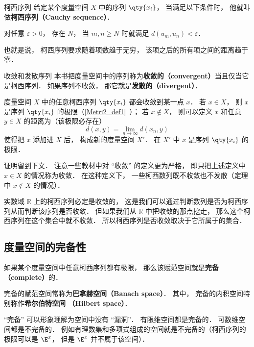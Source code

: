 

\begin{definition}{柯西序列}
给定某个度量空间 $X$ 中的序列 $\qty{x_i}$， 当满足以下条件时， 他就叫做\textbf{柯西序列（Cauchy sequence）}．

对任意 $\varepsilon > 0$， 存在 $N$， 当 $m, n \geqslant N$ 时就满足 $d(u_m, u_n) < \varepsilon$．
\end{definition}
也就是说， 柯西序列要求随着项数趋于无穷， 该项之后的所有项之间的距离趋于零．

\begin{definition}{收敛和发散序列}\label{cauchy_def1}
本书把度量空间中的序列称为\textbf{收敛的（convergent）}当且仅当它是柯西序列． 如果序列不收敛， 那它就是\textbf{发散的（divergent）}．
\end{definition}

\begin{theorem}{}
度量空间 $X$ 中的任意柯西序列 $\qty{x_i}$ 都会收敛到某一点 $x$． 若 $x \in X$， 则 $x$ 是序列 $\qty{x_i}$ 的极限（\autoref{Metri2_def1}~）； 若 $x \notin X$， 则可以定义 $x$ 和任意 $y\in X$ 的距离为（该极限必存在）
\begin{equation}
d(x, y) = \lim_{n\to\infty} d(x_n, y)
\end{equation}
使得把 $x$ 添加进 $X$ 后， 构成新的度量空间 $X'$． 在 $X'$ 中 $x$ 是序列 $\qty{x_i}$ 的极限．
\end{theorem}
证明留到下文． 注意一些教材中对 “收敛” 的定义更为严格， 即只把上述定义中 $x \in X$ 的情况称为收敛． 在这种定义下， 一些柯西数列既不收敛也不发散（定理中 $x\notin X$ 的情况）．






实数域 $\mathbb R$ 上的柯西序列必定是收敛的， 这是我们可以通过判断数列是否为柯西序列从而判断该序列是否收敛． 但如果我们从 $\mathbb R$ 中把收敛的那点挖走， 那么这个柯西序列在这个集合中就不收敛． 所以柯西序列是否收敛取决于它所属于的集合． %

\subsection{度量空间的完备性}
如果某个度量空间中任意柯西序列都有极限， 那么该赋范空间就是\textbf{完备（complete）}的．


完备的赋范空间常称为\textbf{巴拿赫空间（Banach space）}． 其中， 完备的内积空间特别称作\textbf{希尔伯特空间 （Hilbert space）}．

“完备” 可以形象理解为空间中没有 “漏洞”． 有限维空间都是完备的． 可数维空间都是不完备的． 例如有理数集和多项式组成的空间就是不完备的（柯西序列的极限可以是 $\E^x$， 但是 $\E^x$ 并不属于该空间）．
